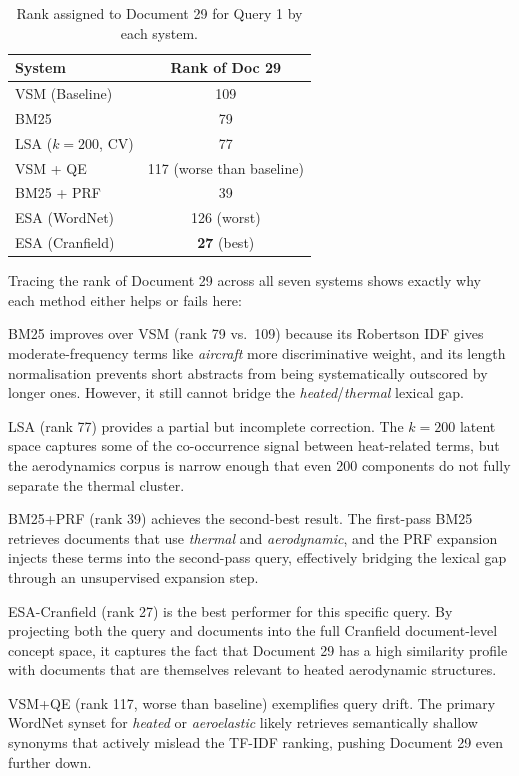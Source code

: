 \documentclass{article}
\begin{document}
\begin{table}[H]
\centering
\renewcommand{\arraystretch}{1.2}
\begin{tabular}{lc}
\toprule
\textbf{System} & \textbf{Rank of Doc 29} \\
\midrule
VSM (Baseline) & 109 \\
BM25           & 79  \\
LSA ($k{=}200$, CV) & 77  \\
VSM + QE       & 117 (worse than baseline) \\
BM25 + PRF     & 39  \\
ESA (WordNet)  & 126 (worst) \\
ESA (Cranfield)& \textbf{27} (best) \\
\bottomrule
\end{tabular}
\caption{Rank assigned to Document 29 for Query 1 by each system.}
\end{table}

Tracing the rank of Document 29 across all seven systems shows exactly why each method either helps or fails here:

BM25 improves over VSM (rank 79 vs.\ 109) because its Robertson IDF gives moderate-frequency terms like \textit{aircraft} more discriminative weight, and its length normalisation prevents short abstracts from being systematically outscored by longer ones. However, it still cannot bridge the \textit{heated}/\textit{thermal} lexical gap.

LSA (rank 77) provides a partial but incomplete correction. The $k{=}200$ latent space captures some of the co-occurrence signal between heat-related terms, but the aerodynamics corpus is narrow enough that even 200 components do not fully separate the thermal cluster.

BM25+PRF (rank 39) achieves the second-best result. The first-pass BM25 retrieves documents that use \textit{thermal} and \textit{aerodynamic}, and the PRF expansion injects these terms into the second-pass query, effectively bridging the lexical gap through an unsupervised expansion step.

ESA-Cranfield (rank 27) is the best performer for this specific query. By projecting both the query and documents into the full Cranfield document-level concept space, it captures the fact that Document 29 has a high similarity profile with documents that are themselves relevant to heated aerodynamic structures.

VSM+QE (rank 117, worse than baseline) exemplifies query drift. The primary WordNet synset for \textit{heated} or \textit{aeroelastic} likely retrieves semantically shallow synonyms that actively mislead the TF-IDF ranking, pushing Document 29 even further down.
\end{document}
